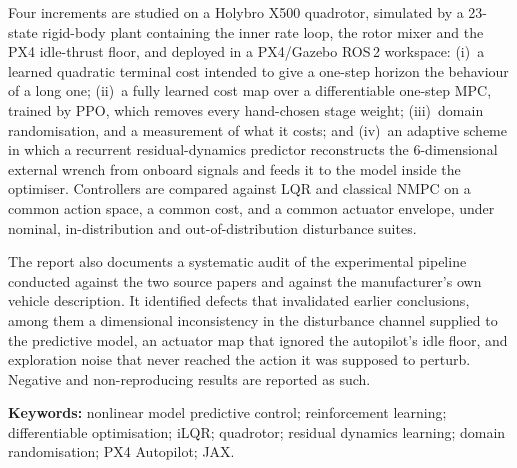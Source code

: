 \documentclass[11pt,a4paper,twoside,openright]{report}
\theoremstyle{plain}
\theoremstyle{definition}
\theoremstyle{remark}
\begin{document}
	Four increments are studied on a Holybro X500 quadrotor, simulated by a
	\num{23}-state rigid-body plant containing the inner rate loop, the rotor mixer
	and the PX4 idle-thrust floor, and deployed in a PX4/Gazebo ROS\,2 workspace:
	(i)~a learned quadratic terminal cost intended to give a one-step horizon the
	behaviour of a long one; (ii)~a fully learned cost map over a differentiable
	one-step MPC, trained by PPO, which removes every hand-chosen stage weight;
	(iii)~domain randomisation, and a measurement of what it costs; and (iv)~an
	adaptive scheme in which a recurrent residual-dynamics predictor reconstructs
	the \num{6}-dimensional external wrench from onboard signals and feeds it to the
	model inside the optimiser. Controllers are compared against LQR and classical
	NMPC on a common action space, a common cost, and a common actuator envelope,
	under nominal, in-distribution and out-of-distribution disturbance suites.

	The report also documents a systematic audit of the experimental pipeline
	conducted against the two source papers and against the manufacturer's own
	vehicle description. It identified defects that invalidated earlier conclusions,
	among them a dimensional inconsistency in the disturbance channel supplied to
	the predictive model, an actuator map that ignored the autopilot's idle floor,
	and exploration noise that never reached the action it was supposed to perturb.
	Negative and non-reproducing results are reported as such.

	\vspace{4mm}
	\noindent\textbf{Keywords:} nonlinear model predictive control; reinforcement
	learning; differentiable optimisation; iLQR; quadrotor; residual dynamics
	learning; domain randomisation; PX4 Autopilot; JAX.
\end{document}
